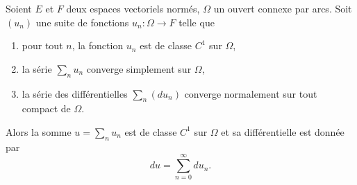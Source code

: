 \begin{theorem} \label{ThoLDpRmXQ}
	Soient \( E\) et \( F\) deux espaces vectoriels normés, \( \Omega\) un ouvert connexe par arcs. Soit \( (u_n)\) une suite de fonctions \( u_n\colon \Omega\to F\) telle que
	\begin{enumerate}
		\item
		      pour tout \( n\), la fonction \( u_n\) est de classe \( C^1\) sur \( \Omega\),
		\item
		      la série \( \sum_nu_n\) converge simplement sur \( \Omega\),
		\item
		      la série des différentielles \( \sum_n(du_n)\) converge normalement sur tout compact de \( \Omega\).
	\end{enumerate}
	Alors la somme \( u=\sum_nu_n\) est de classe \( C^1\) sur \( \Omega\) et sa différentielle est donnée par
	\begin{equation}
		du=\sum_{n=0}^{\infty}du_n.
	\end{equation}
\end{theorem}


